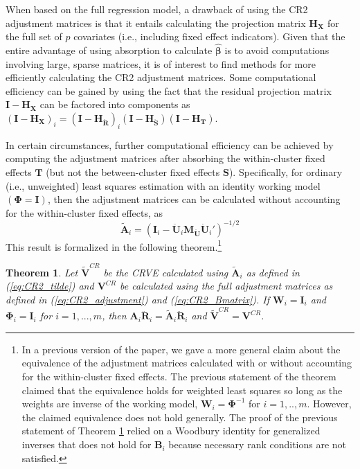 \documentclass[12pt]{article}
\newtheorem{thm}{Theorem}
\begin{document}
When based on the full regression model, a drawback of using the CR2
adjustment matrices is that it entails calculating the projection matrix
\(\mathbf{H_X}\) for the full set of \(p\) covariates (i.e., including
fixed effect indicators). Given that the entire advantage of using
absorption to calculate \(\hat{\boldsymbol\beta}\) is to avoid
computations involving large, sparse matrices, it is of interest to find
methods for more efficiently calculating the CR2 adjustment matrices.
Some computational efficiency can be gained by using the fact that the
residual projection matrix \(\mathbf{I} - \mathbf{H_X}\) can be factored
into components as
\(\left(\mathbf{I} - \mathbf{H_X}\right)_i = \left(\mathbf{I} - \mathbf{H_{\ddot{R}}}\right)_i \left(\mathbf{I} - \mathbf{H_{\ddot{S}}}\right) \left(\mathbf{I} - \mathbf{H_T}\right)\).

In certain circumstances, further computational efficiency can be
achieved by computing the adjustment matrices after absorbing the
within-cluster fixed effects \(\mathbf{T}\) (but not the between-cluster
fixed effects \(\mathbf{S}\)). Specifically, for ordinary (i.e.,
unweighted) least squares estimation with an identity working model
\((\boldsymbol\Phi = \mathbf{I})\), then the adjustment matrices can be
calculated without accounting for the within-cluster fixed effects, as
\begin{equation}
\label{eq:CR2_tilde}
\mathbf{\tilde{A}}_i = \left(\mathbf{I}_i - \mathbf{\ddot{U}}_i\mathbf{M}_{\mathbf{\ddot{U}}} \mathbf{\ddot{U}}_i'\right)^{-1/2}
\end{equation} This result is formalized in the following
theorem.\footnote{In a previous version of the paper, we gave a more
  general claim about the equivalence of the adjustment matrices
  calculated with or without accounting for the within-cluster fixed
  effects. The previous statement of the theorem claimed that the
  equivalence holds for weighted least squares so long as the weights
  are inverse of the working model,
  \(\mathbf{W}_i = \boldsymbol\Phi^{-1}\) for \(i = 1,..,m\). However,
  the claimed equivalence does not hold generally. The proof of the
  previous statement of Theorem \ref{thm:absorb} relied on a Woodbury
  identity for generalized inverses that does not hold for
  \(\mathbf{B}_i\) because necessary rank conditions are not satisfied.}

\begin{thm}
\label{thm:absorb}
Let $\mathbf{\tilde{V}}^{CR}$ be the CRVE calculated using $\mathbf{\tilde{A}}_i$ as defined in (\ref{eq:CR2_tilde}) and $\mathbf{V}^{CR}$ be calculated using the full adjustment matrices as defined in (\ref{eq:CR2_adjustment}) and (\ref{eq:CR2_Bmatrix}).
If $\mathbf{W}_i = \mathbf{I}_i$ and $\boldsymbol\Phi_i = \mathbf{I}_i$ for $i = 1,...,m$, then $\mathbf{A}_i \mathbf{\ddot{R}}_i = \mathbf{\tilde{A}}_i \mathbf{\ddot{R}}_i$ and $\mathbf{\tilde{V}}^{CR} = \mathbf{V}^{CR}$.
\end{thm}
\end{document}
